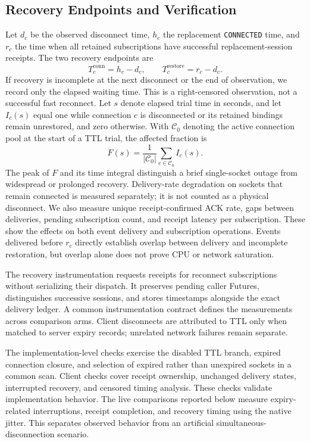 \subsection{Recovery Endpoints and Verification}

Let $d_c$ be the observed disconnect time, $h_c$ the replacement
\texttt{CONNECTED} time, and $r_c$ the time when all retained subscriptions
have successful replacement-session receipts. The two recovery endpoints are
\[
 T_c^{\mathrm{conn}}=h_c-d_c, \qquad T_c^{\mathrm{restore}}=r_c-d_c.
\]
If recovery is incomplete at the next disconnect or the end of observation,
we record only the elapsed waiting time. This is a right-censored observation,
not a successful fast reconnect. Let $s$ denote elapsed trial time in seconds,
and let $I_c(s)$
equal one while connection $c$ is disconnected or its retained bindings remain
unrestored, and zero otherwise. With $\mathcal{C}_0$ denoting the active
connection pool at the start of a TTL trial, the affected fraction is
\[
 F(s)=\frac{1}{|\mathcal{C}_0|}
 \sum_{c\in\mathcal{C}_0} I_c(s).
\]
The peak of $F$ and its time integral distinguish a brief single-socket outage
from widespread or prolonged recovery. Delivery-rate degradation on sockets
that remain connected is measured separately; it is not counted as a physical
disconnect. We also measure unique receipt-confirmed ACK rate, gaps between deliveries,
pending subscription count, and receipt latency per subscription. These show
the effects on both event delivery and subscription operations. Events delivered before $r_c$
directly establish overlap between delivery and incomplete restoration, but
overlap alone does not prove CPU or network saturation.

The recovery instrumentation requests receipts for reconnect subscriptions
without serializing their dispatch. It preserves pending caller Futures,
distinguishes successive sessions, and stores timestamps alongside the exact
delivery ledger. A common instrumentation contract defines the measurements
across comparison arms.
Client disconnects are attributed to TTL only when matched to server expiry
records; unrelated network failures remain separate.

The implementation-level checks exercise the disabled TTL branch, expired
connection closure, and selection of expired rather than unexpired sockets
in a common scan. Client checks cover receipt ownership, unchanged delivery
states, interrupted recovery, and censored timing analysis. These checks
validate implementation behavior. The live comparisons reported below measure
expiry-related interruptions, receipt completion, and recovery timing using
the native jitter. This separates observed behavior from an artificial
simultaneous-disconnection scenario.

